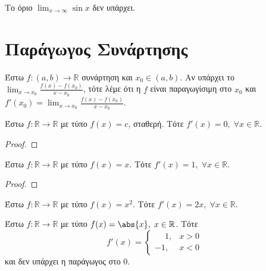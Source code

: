 \documentclass[main.tex]{subfiles}
\begin{document}
        \begin{examples}
        \end{examples}

        \begin{prop}
            Το όριο $ \lim_{x \to \infty} \sin{x} $ δεν υπάρχει.
        \end{prop}

        \section{Παράγωγος Συνάρτησης}

        \begin{dfn}
            Έστω $ f \colon (a,b) \to \mathbb{R} $ συνάρτηση και $ x_{0} \in (a,b) $. Αν 
            υπάρχει το $ \lim_{x \to x_{0}} \frac{f(x) - f(x_{0})}{x - x_{0}}$, τότε λέμε ότι 
            η $f$ είναι παραγωγίσιμη στο $ x_{0} $ και $ f'(x_{0}) = \lim_{x \to x_{0}} 
            \frac{f(x)-f(x_{0})}{x- x_{0}} $.
        \end{dfn}

        \begin{prop}
            Έστω $ f \colon \mathbb{R} \to \mathbb{R} $ με τύπο $ f(x)=c $, σταθερή. Τότε 
            $ f'(x) = 0, \; \forall x \in \mathbb{R} $. 
        \end{prop}

        \begin{proof}

        \end{proof}

        \begin{prop}
            Έστω $ f \colon \mathbb{R} \to \mathbb{R} $ με τύπο $ f(x)=x $. Τότε 
            $ f'(x) = 1, \; \forall x \in \mathbb{R} $. 
        \end{prop}

        \begin{proof}

        \end{proof}

        \begin{prop}
            Έστω $ f \colon \mathbb{R} \to \mathbb{R} $ με τύπο $ f(x)=x^{2} $. Τότε 
            $ f'(x) = 2x, \; \forall x \in \mathbb{R} $. 
        \end{prop}

        \begin{prop}
            Έστω $ f \colon \mathbb{R} \to \mathbb{R} $ με τύπο $ f(x) = \abs{x}, \; 
            x \in \mathbb{R}$. Τότε 
            \[
                f'(x) = \begin{cases} \phantom{-}1, & x>0 \\ -1, & x<0 \end{cases} 
            \] 
            και δεν υπάρχει η παράγωγος στο $0$.
            \end{prop}
\end{document}
